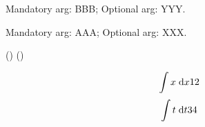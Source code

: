 \documentclass{article}
\newcommand{\example}[2][YYY]{Mandatory arg: #2; Optional arg: #1.}
\newcommand{\dx}[3][]{%
   \ifthenelse{ \equal{#1}{} }
      {\ensuremath{\;\mathrm{d}x} #2 #3}
      {\ensuremath{\;\mathrm{d}#1} #2 #3}
}
\begin{document}
    \example{BBB} \par
    \example[XXX]{AAA}


    \DeclareDocumentCommand{}
    ()
    ()


    $$\int x\dx{1}{2}$$
    $$\int t\dx[t]{3}{4}$$
\end{document}
